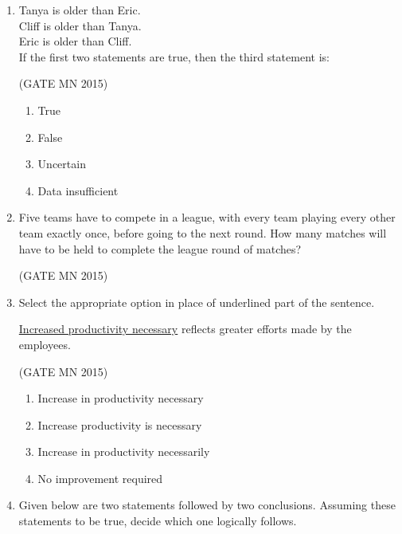 \documentclass[journal]{IEEEtran}
\begin{document}
\begin{enumerate}
\item Tanya is older than Eric.\\
Cliff is older than Tanya.\\
Eric is older than Cliff.\\

If the first two statements are true, then the third statement is:


\hfill(GATE MN 2015)
\begin{enumerate}

    \item True
    \item False
    \item Uncertain
    \item Data insufficient
\end{enumerate}


\item Five teams have to compete in a league, with every team playing every other team exactly once, before going to the next round. How many matches will have to be held to complete the league round of matches?

	\hfill(GATE MN 2015)

\begin{enumerate}
\end{enumerate}


\item Select the appropriate option in place of underlined part of the sentence.  

\underline{Increased productivity necessary} reflects greater efforts made by the employees.  


\hfill(GATE MN 2015)
\begin{enumerate}
\item Increase in productivity necessary
\item Increase productivity is necessary
\item Increase in productivity necessarily
\item No improvement required
\end{enumerate}

\item Given below are two statements followed by two conclusions. Assuming these statements to be true, decide which one logically follows.  


\end{enumerate}
\end{document}
